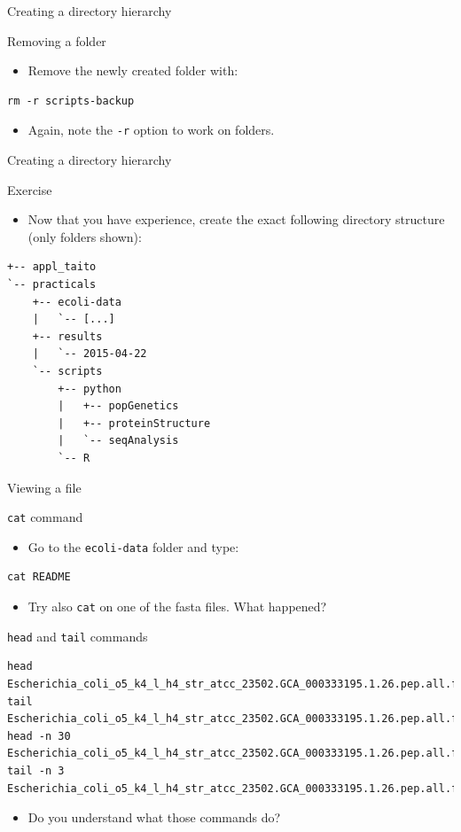 \documentclass[big]{beamer}
\begin{document}
\begin{frame}[fragile,label=sec-2-26]{Creating a directory hierarchy}
 \begin{block}{Removing a folder}
\begin{itemize}
\item Remove the newly created folder with:
\end{itemize}
\begin{verbatim}
rm -r scripts-backup
\end{verbatim}
\begin{itemize}
\item Again, note the \texttt{-r} option to work on folders.
\end{itemize}
\end{block}
\end{frame}
\begin{frame}[fragile,label=sec-2-27]{Creating a directory hierarchy}
 \begin{block}{Exercise}
\begin{itemize}
\item Now that you have experience, create the exact following directory structure
(only folders shown):
\end{itemize}
\begin{verbatim}
+-- appl_taito
`-- practicals
    +-- ecoli-data
    |   `-- [...]
    +-- results
    |   `-- 2015-04-22
    `-- scripts
        +-- python
        |   +-- popGenetics
        |   +-- proteinStructure
        |   `-- seqAnalysis
        `-- R
\end{verbatim}
\end{block}
\end{frame}
\begin{frame}[fragile,label=sec-2-28]{Viewing a file}
 \begin{block}{\texttt{cat} command}
\begin{itemize}
\item Go to the \texttt{ecoli-data} folder and type:
\end{itemize}
\begin{verbatim}
cat README
\end{verbatim}
\begin{itemize}
\item Try also \texttt{cat} on one of the fasta files. What happened?
\end{itemize}
\end{block}
\begin{block}{\texttt{head} and \texttt{tail} commands}
\begin{verbatim}
head Escherichia_coli_o5_k4_l_h4_str_atcc_23502.GCA_000333195.1.26.pep.all.fa
tail Escherichia_coli_o5_k4_l_h4_str_atcc_23502.GCA_000333195.1.26.pep.all.fa
head -n 30 Escherichia_coli_o5_k4_l_h4_str_atcc_23502.GCA_000333195.1.26.pep.all.fa
tail -n 3 Escherichia_coli_o5_k4_l_h4_str_atcc_23502.GCA_000333195.1.26.pep.all.fa
\end{verbatim}
\begin{itemize}
\item Do you understand what those commands do?
\end{itemize}
\end{block}
\end{frame}
\end{document}
